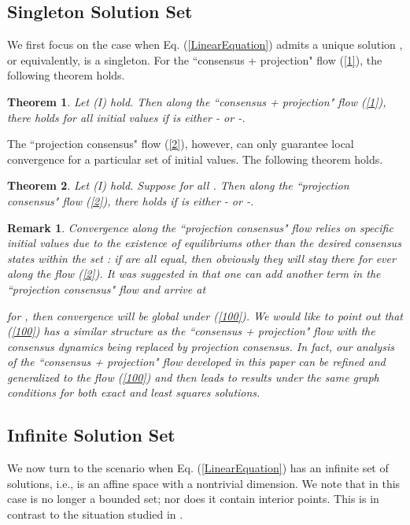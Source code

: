 \documentclass[a4paper, 11pt]{article}
\newtheorem{theorem}{Theorem}
\newtheorem{remark}{Remark}
\begin{document}
\subsection{Singleton  Solution Set}
We first focus on the case when Eq. (\ref{LinearEquation}) admits a unique solution , or equivalently,   is a singleton. For the ``consensus + projection" flow (\ref{1}), the following theorem holds.



\begin{theorem}\label{thm1}
Let (I) hold. Then  along  the ``consensus + projection" flow (\ref{1}), there holds  for all initial values if  is either  - or -.
\end{theorem}


The ``projection consensus" flow (\ref{2}), however, can only guarantee local convergence for a particular set of initial values. The following theorem holds.
\begin{theorem}\label{thm2}
Let (I) hold. Suppose  for all . Then  along  the  ``projection consensus" flow (\ref{2}), there holds
 if  is either  - or -.
\end{theorem}


\begin{remark}
Convergence along the ``projection consensus" flow relies on specific  initial values  due to the existence of equilibriums other than the desired consensus states within the set : if  are all equal, then obviously they will stay there for ever along the flow (\ref{2}). It was suggested in \cite{brian15} that one can add another term in the ``projection consensus" flow and arrive at

for , then convergence will be global under (\ref{100}). We would like to point out that (\ref{100}) has a similar structure  as the ``consensus + projection" flow with the consensus dynamics being replaced by projection consensus.  In fact, our analysis of the ``consensus + projection" flow developed  in  this paper can be refined and generalized to  the flow (\ref{100}) and then leads to  results under the same graph conditions for both exact and least squares solutions.
\end{remark}

\subsection{Infinite  Solution Set}
We now turn to the scenario when Eq. (\ref{LinearEquation}) has an infinite set of  solutions, i.e.,  is an affine space with a nontrivial dimension. We note that in this case  is no longer a bounded set; nor does it contain interior points. This is in contrast to the situation studied in \cite{nedic10,shitac}.
\end{document}
